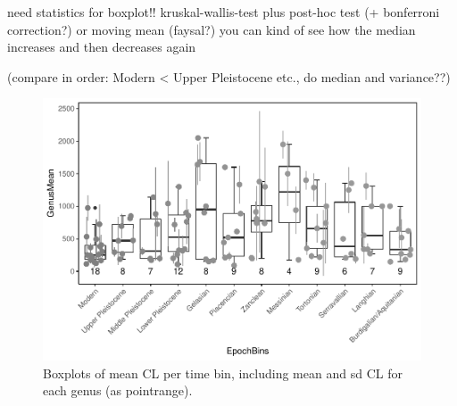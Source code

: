 \FloatBarrier



need statistics for boxplot!! kruskal-wallis-test plus post-hoc test (+ bonferroni correction?) or moving mean (faysal?)
you can kind of see how the median increases and then decreases again

(compare in order: Modern < Upper Pleistocene etc., do median and variance??)



\begin{figure}[H]
	\centering
	\includegraphics{MA_JJ_files/figure-latex/BPGBins-1.pdf}
	\caption{Boxplots of mean CL per time bin, including mean and sd CL for
		each genus (as pointrange).}
	\label{fig:boxBins}
\end{figure}



